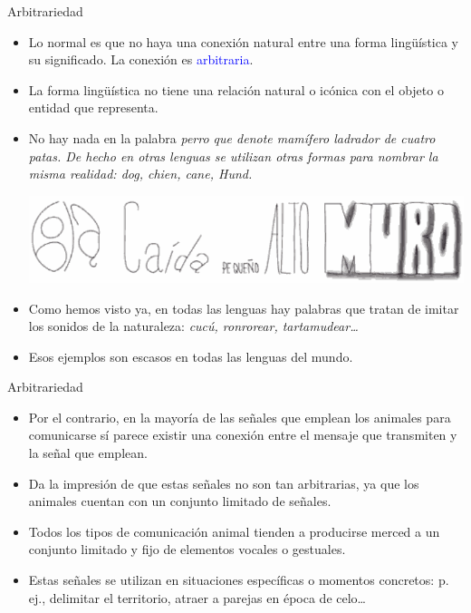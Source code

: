 \documentclass[handout]{beamer}
\begin{document}
\begin{frame}{Arbitrariedad}

\begin{itemize}
	\item Lo normal es que no haya una conexión natural entre una forma lingüística y su significado. La conexión es \textcolor{blue}{arbitraria}.
	\item La forma lingüística no tiene una relación natural o icónica con el objeto o entidad que representa.
	\item No hay nada en la palabra \it{perro} que denote \it{mamífero ladrador de cuatro patas}. De hecho en otras lenguas se utilizan otras formas para nombrar la misma realidad: \it{dog, chien, cane, Hund}. 
	\begin{center} 
	  \includegraphics[scale=0.3]{img/palabras-iconicas.png} 
	\end{center}
	\item Como hemos visto ya, en todas las lenguas hay palabras que tratan de imitar los sonidos de la naturaleza: \it{cucú, ronrorear, tartamudear\ldots} 
	\item Esos ejemplos son escasos en todas las lenguas del mundo.
\end{itemize}

\end{frame}

\begin{frame}{Arbitrariedad}

\begin{itemize}
	\item Por el contrario, en la mayoría de las señales que emplean los animales para comunicarse sí parece existir una conexión entre el mensaje que transmiten y la señal que emplean.
	\item Da la impresión de que estas señales no son tan arbitrarias, ya que los animales cuentan con un conjunto limitado de señales.
	\item Todos los tipos de comunicación animal tienden a producirse merced a un conjunto limitado y fijo de elementos vocales o gestuales. 
	\item Estas señales se utilizan en situaciones específicas o momentos concretos: p. ej., delimitar el territorio, atraer a parejas en época de celo\ldots 
\end{itemize}

\end{frame}
\end{document}
